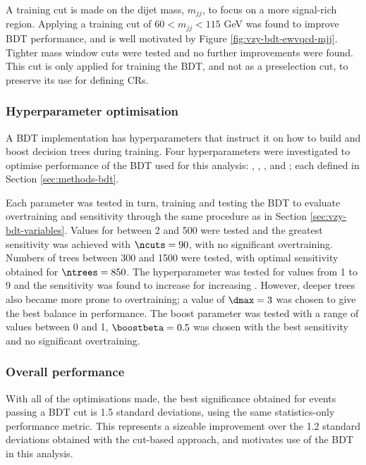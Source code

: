 A training cut is made on the dijet mass, $m_{jj}$, to focus on a more
signal-rich region. Applying a training cut of $60 < m_{jj} < 115$ GeV was found
to improve \ac{BDT} performance, and is well motivated by Figure
\ref{fig:vzy-bdt-ewvqcd-mjj}. Tighter mass window cuts were tested and no
further improvements were found.  This cut is only applied for training the
\ac{BDT}, and not as a preselection cut, to preserve its use for defining
\acp{CR}.

\subsubsection{Hyperparameter optimisation}

A \ac{BDT} implementation has hyperparameters that instruct it on how to build
and boost decision trees during training.
Four hyperparameters were investigated to optimise performance of the \ac{BDT}
used for this analysis: \ncuts, \ntrees, \dmax, and \boostbeta; each defined in
Section \ref{sec:methods-bdt}.

Each parameter was tested in turn, training and testing the \ac{BDT} to evaluate
overtraining and sensitivity through the same procedure as in Section
\ref{sec:vzy-bdt-variables}. Values for \ncuts between 2 and 500 were tested and
the greatest sensitivity was achieved with $\ncuts=90$, with no significant
overtraining. Numbers of trees between 300 and 1500 were tested, with optimal
sensitivity obtained for $\ntrees=850$. The \dmax hyperparameter was tested
for values from 1 to 9 and the sensitivity was found to increase for increasing
\dmax. However, deeper trees also became more prone to overtraining; a value
of $\dmax=3$ was chosen to give the best balance in performance.
The boost \boostbeta parameter was tested with a range of values
between 0 and 1, $\boostbeta=0.5$ was chosen with the best sensitivity and no
significant overtraining.

\subsubsection{Overall performance}

With all of the optimisations made, the best significance obtained for events
passing a \ac{BDT} cut is 1.5 standard deviations, using the same
statistics-only performance metric. This represents a sizeable
improvement over the 1.2 standard deviations obtained with the cut-based
approach, and motivates use of the \ac{BDT} in this analysis.
